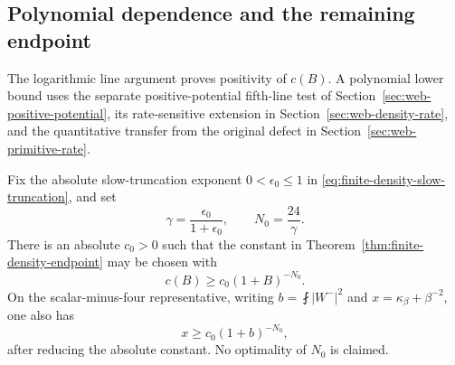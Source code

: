 \subsection{Polynomial dependence and the remaining endpoint}

The logarithmic line argument proves positivity of $c(B)$.  A
polynomial lower bound uses the separate positive-potential fifth-line
test of Section~\ref{sec:web-positive-potential}, its rate-sensitive
extension in Section~\ref{sec:web-density-rate}, and the quantitative
transfer from the original defect in Section~\ref{sec:web-primitive-rate}.

\begin{corollary}
\label{cor:finite-density-polynomial}
Fix the absolute slow-truncation exponent $0<\epsilon_0\le1$ in
\eqref{eq:finite-density-slow-truncation}, and set
\[
 \gamma=\frac{\epsilon_0}{1+\epsilon_0},\qquad
 N_0=\frac{24}{\gamma}.
\]
There is an absolute $c_0>0$ such that the constant in
Theorem~\ref{thm:finite-density-endpoint} may be chosen with
\begin{equation}
 c(B)\ge c_0(1+B)^{-N_0}.
 \label{eq:finite-density-polynomial}
\end{equation}
On the scalar-minus-four representative, writing
$b=\fint|W^-|^2$ and $x=\kappa_\beta+\beta^{-2}$, one also has
\begin{equation}
 x\ge c_0(1+b)^{-N_0},
 \label{eq:finite-density-curvature-rate}
\end{equation}
after reducing the absolute constant.  No optimality of $N_0$ is
claimed.
\end{corollary}

